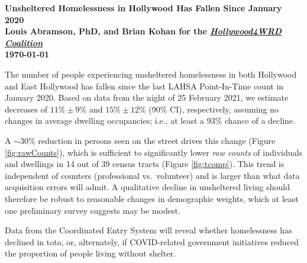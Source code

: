 \documentclass[11pt]{article}
\def\resp{respectively}
\begin{document}

\begin{center}
	\Large\bf Unsheltered Homelessness in Hollywood Has Fallen Since January 2020\\
	\vspace{1ex}
	{\normalsize\rm Louis Abramson, PhD, and Brian Kohan 
	for the \href{http://www.hollywood4wrd.live}{\it Hollywood4WRD Coalition} \\ \today}


\end{center}

 The number of people experiencing unsheltered homelessness in both Hollywood 
and East Hollywood has fallen since the last LAHSA Point-In-Time count in January 2020. Based on data 
from the night of 25 February 2021, we estimate decreases of $11\%\pm9\%$ and $15\%\pm12\%$ (90\% CI), 
\resp, assuming no changes in average dwelling occupancies; i.e., at least a 93\% chance of a decline.

A $\sim$30\% reduction in persons seen on the street drives this change (Figure \ref{fig:rawCounts}), which is 
sufficient to significantly lower {\it raw counts} of individuals and dwellings in 14 out of 39 census tracts (Figure 
\ref{fig:tcomp}). 
This trend is independent of counters (professional vs.\ volunteer) and is larger than what data acquisition errors 
will admit. A qualitative decline in unsheltered living should therefore be robust to reasonable changes in 
demographic weights, which at least one preliminary survey suggests may be modest.

Data from the Coordinated Entry System will reveal whether homelessness has declined in toto, or, alternately,
if COVID-related government initiatives reduced the proportion of people living without shelter.
\end{document}
